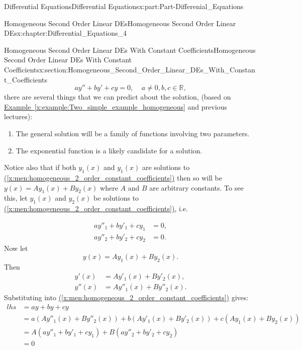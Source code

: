 \documentclass[oneside,10pt,]{book}
\newcommand{\xreffont}{\relax}
\numberwithin{equation}{section}
\newcommand{\amp}{&}
\begin{document}
\begin{partptx}{Differential Equations}{}{Differential Equations}{}{}{x:part:Part-Differenial_Equations}
\begin{chapterptx}{Homogeneous Second Order Linear DEs}{}{Homogeneous Second Order Linear DEs}{}{}{x:chapter:Differential_Equations_4}
\begin{sectionptx}{Homogeneous Second Order Linear DEs With Constant Coefficients}{}{Homogeneous Second Order Linear DEs With Constant Coefficients}{}{}{x:section:Homogeneous_Second_Order_Linear_DEs_With_Constant_Coefficients}
%
\begin{equation}
ay''+by'+cy=0,\;\;\;\; a\neq 0, b,c\in \mathbb{R}, \label{x:men:homogeneous_2_order_constant_coefficients}
\end{equation}
there are several things that we can predict about the solution, (based on \hyperref[x:example:Two_simple_example_homogeneous]{Example~{\xreffont\ref{x:example:Two_simple_example_homogeneous}}} and previous lectures):%
\par
%
\begin{enumerate}[label=\alph*]
\item{}The general solution will be a family of functions involving two parameters.%
\item{}The exponential function is a likely candidate for a solution.%
\end{enumerate}
%
\par
Notice also that if both \(y_{1}(x) \)  and \(y_{1}(x) \)  are solutions to \hyperref[x:men:homogeneous_2_order_constant_coefficients]{({\xreffont\ref{x:men:homogeneous_2_order_constant_coefficients}})} then so will be \(y(x)=A y_{1}(x)+B y_{2}(x) \) where \(A \) and \(B \) are arbitrary constants. To see this, let \(y_{1}(x) \)  and \(y_{2}(x) \)  be solutions to \hyperref[x:men:homogeneous_2_order_constant_coefficients]{({\xreffont\ref{x:men:homogeneous_2_order_constant_coefficients}})}, i.e.%
\par
%
\begin{align*}
ay''_{1}+by'_{1}+cy_{1} \amp =0,  \\
ay''_{2}+by'_{2}+cy_{2} \amp =0.  
\end{align*}
Now let%
\begin{equation*}
y(x) = A y_{1}(x) + B y_{2}(x). 
\end{equation*}
Then%
\begin{align*}
y'(x) \amp =  A y'_{1}(x) + B y'_{2}(x),  \\
y''(x) \amp =  A y''_{1}(x) + B y''_{2}(x).  
\end{align*}
Substituting into \hyperref[x:men:homogeneous_2_order_constant_coefficients]{({\xreffont\ref{x:men:homogeneous_2_order_constant_coefficients}})} gives:%
\begin{align*}
lhs \amp =  ay + by +cy  \\
\amp = a(A y''_{1}(x) + B y''_{2}(x)) + b(A y'_{1}(x) + B y'_{2}(x)) +c(A y_{1}(x) + B y_{2}(x))   \\
\amp = A(ay''_{1}+by'_{1}+cy_{1}) + B(ay''_{2}+by'_{2}+cy_{2})   \\
\amp = 0  

\end{align*}
\end{sectionptx}
\end{chapterptx}
\end{partptx}
\end{document}
